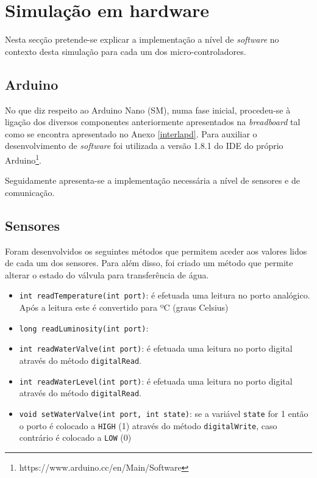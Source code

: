 \newpage
\section{Simulação em hardware}

Nesta secção pretende-se explicar a implementação a nível de \textit{software} no contexto desta simulação para cada um dos micro-controladores. 


\subsection{Arduino}

No que diz respeito ao Arduino Nano (\ac{SM}), numa fase inicial,  procedeu-se à ligação dos diversos componentes anteriormente apresentados na \textit{breadboard} tal como se encontra apresentado no Anexo \ref{interlapd}. Para auxiliar o desenvolvimento de \textit{software} foi utilizada a versão 1.8.1 do \ac{IDE} do próprio Arduino\footnote{https://www.arduino.cc/en/Main/Software}.  

Seguidamente apresenta-se a implementação necessária a nível de sensores e de comunicação. 

\subsection{Sensores}



Foram desenvolvidos os seguintes métodos que permitem aceder aos valores lidos de cada um dos sensores. Para além disso, foi criado um método que permite alterar o estado do válvula para transferência de água. 

\begin{itemize}
	\item \texttt{int readTemperature(int port)}: é efetuada uma leitura no porto analógico. Após a leitura este é convertido para ºC (graus Celsius)
	
	\item \texttt{long readLuminosity(int port)}: 
	
	\item \texttt{int readWaterValve(int port)}: é efetuada uma leitura no porto digital através do método \texttt{digitalRead}. 
	
	\item \texttt{int readWaterLevel(int port)}: é efetuada uma leitura no porto digital através do método \texttt{digitalRead}.
	
	
	\item \texttt{void setWaterValve(int port, int state)}: se a variável \texttt{state} for 1 então o porto é colocado a \texttt{HIGH} (1) através do método \texttt{digitalWrite}, caso contrário é colocado a \texttt{LOW} (0)
	
\end{itemize}

